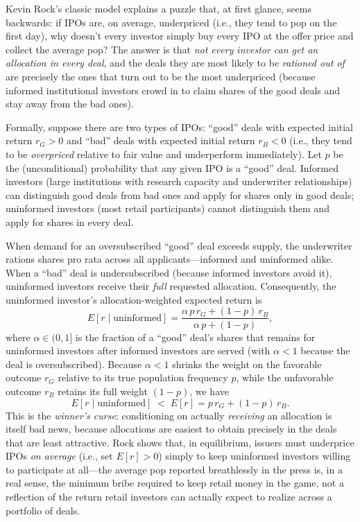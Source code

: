 \documentclass[conference]{IEEEtran}
\begin{document}
Kevin Rock's classic model \cite{rock1986} explains a puzzle that, at first glance, seems backwards: if IPOs are, on average, underpriced (i.e., they tend to pop on the first day), why doesn't every investor simply buy every IPO at the offer price and collect the average pop? The answer is that \emph{not every investor can get an allocation in every deal}, and the deals they are most likely to be \emph{rationed out of} are precisely the ones that turn out to be the most underpriced (because informed institutional investors crowd in to claim shares of the good deals and stay away from the bad ones).

Formally, suppose there are two types of IPOs: ``good'' deals with expected initial return $r_G > 0$ and ``bad'' deals with expected initial return $r_B < 0$ (i.e., they tend to be \emph{overpriced} relative to fair value and underperform immediately). Let $p$ be the (unconditional) probability that any given IPO is a ``good'' deal. Informed investors (large institutions with research capacity and underwriter relationships) can distinguish good deals from bad ones and apply for shares only in good deals; uninformed investors (most retail participants) cannot distinguish them and apply for shares in every deal.

When demand for an oversubscribed ``good'' deal exceeds supply, the underwriter rations shares pro rata across all applicants---informed and uninformed alike. When a ``bad'' deal is undersubscribed (because informed investors avoid it), uninformed investors receive their \emph{full} requested allocation. Consequently, the uninformed investor's allocation-weighted expected return is
\begin{equation}
E[r \mid \text{uninformed}] = \frac{\alpha\, p\, r_G + (1-p)\, r_B}{\alpha\, p + (1-p)},
\label{eq:winners-curse}
\end{equation}
where $\alpha \in (0,1]$ is the fraction of a ``good'' deal's shares that remains for uninformed investors after informed investors are served (with $\alpha < 1$ because the deal is oversubscribed). Because $\alpha < 1$ shrinks the weight on the favorable outcome $r_G$ relative to its true population frequency $p$, while the unfavorable outcome $r_B$ retains its full weight $(1-p)$, we have
\begin{equation}
E[r \mid \text{uninformed}] \;<\; E[r] = p\, r_G + (1-p)\, r_B.
\end{equation}
This is the \emph{winner's curse}: conditioning on actually \emph{receiving} an allocation is itself bad news, because allocations are easiest to obtain precisely in the deals that are least attractive. Rock shows that, in equilibrium, issuers must underprice IPOs \emph{on average} (i.e., set $E[r] > 0$) simply to keep uninformed investors willing to participate at all---the average pop reported breathlessly in the press is, in a real sense, the minimum bribe required to keep retail money in the game, not a reflection of the return retail investors can actually expect to realize across a portfolio of deals.
\end{document}
